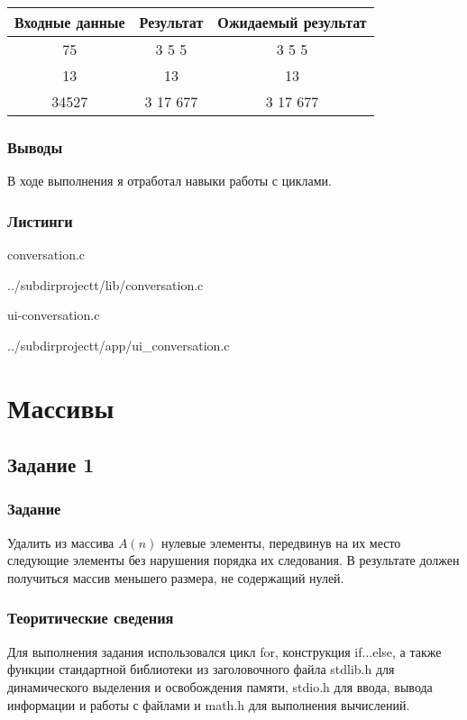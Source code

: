 \documentclass[12pt,a4paper]{report}
\begin{document}
	 \vspace{\baselineskip}
 
 \begin{tabular}{|c|c|c|}
 	\hline 	
 	Входные данные & Результат & Ожидаемый  результат \\
 	\hline
	75 & 3 5 5 & 3 5 5 \\
	\hline
	13 & 13 & 13 \\
	\hline
	34527 & 3 17 677 & 3 17 677\\
 	\hline
 	
 \end{tabular}

\subsection{Выводы}
В ходе выполнения я отработал навыки работы с циклами.
\subsection*{Листинги}
conversation.c

{../subdirprojectt/lib/conversation.c}

\vspace{\baselineskip}

ui-conversation.c

{../subdirprojectt/app/ui_conversation.c}

\chapter{Массивы}
\section{Задание 1}
\subsection{Задание}

Удалить из массива $A(n)$ нулевые элементы, передвинув на их место следующие элементы без нарушения порядка их следования. В результате должен получиться массив меньшего размера, не содержащий нулей.

\subsection{Теоритические сведения}

Для выполнения задания использовался цикл for, конструкция if...else, а также функции стандартной библиотеки из заголовочного файла stdlib.h для динамического выделения и освобождения памяти, stdio.h для ввода, вывода информации и работы с файлами и math.h для выполнения вычислений.
\end{document}
